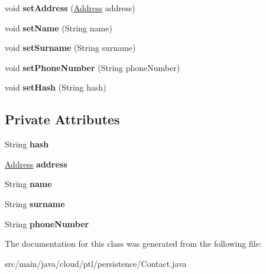 \begin{DoxyCompactItemize}
\mbox{\label{classcloud_1_1ptl_1_1persistence_1_1Contact_a5678d9b0baf9a769dbd1ef55a1c34a06}} 
void {\bfseries set\+Address} (\hyperlink{classcloud_1_1ptl_1_1persistence_1_1Address}{Address} address)
\item 
\mbox{\label{classcloud_1_1ptl_1_1persistence_1_1Contact_a849698b63816e6d1c8dc682f0384732f}} 
void {\bfseries set\+Name} (String name)
\item 
\mbox{\label{classcloud_1_1ptl_1_1persistence_1_1Contact_ac72e996bcc5d125ffd9a07874b39be44}} 
void {\bfseries set\+Surname} (String surname)
\item 
\mbox{\label{classcloud_1_1ptl_1_1persistence_1_1Contact_a5547e57c669f1a6de9691a1ab47d5f26}} 
void {\bfseries set\+Phone\+Number} (String phone\+Number)
\item 
\mbox{\label{classcloud_1_1ptl_1_1persistence_1_1Contact_ac1d4a228747fb867e2773f7c020a9cbe}} 
void {\bfseries set\+Hash} (String hash)
\end{DoxyCompactItemize}
\subsection*{Private Attributes}
\begin{DoxyCompactItemize}
\item 
\mbox{\label{classcloud_1_1ptl_1_1persistence_1_1Contact_a38119a4d669f08b70046184cddb93c53}} 
String {\bfseries hash}
\item 
\mbox{\label{classcloud_1_1ptl_1_1persistence_1_1Contact_abdfad8c1a96dc90f995763c9a219125d}} 
\hyperlink{classcloud_1_1ptl_1_1persistence_1_1Address}{Address} {\bfseries address}
\item 
\mbox{\label{classcloud_1_1ptl_1_1persistence_1_1Contact_a752a428438ac61bca2f7f48f541a4d63}} 
String {\bfseries name}
\item 
\mbox{\label{classcloud_1_1ptl_1_1persistence_1_1Contact_aab338712c38ce4412e274d56f41de3aa}} 
String {\bfseries surname}
\item 
\mbox{\label{classcloud_1_1ptl_1_1persistence_1_1Contact_a62fb5cb4f6117cb8e568b4ff4094f33b}} 
String {\bfseries phone\+Number}
\end{DoxyCompactItemize}


The documentation for this class was generated from the following file\+:\begin{DoxyCompactItemize}
\item 
src/main/java/cloud/ptl/persistence/Contact.\+java\end{DoxyCompactItemize}
